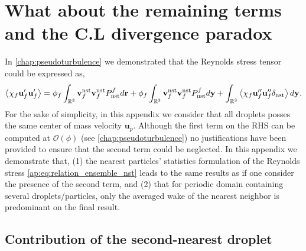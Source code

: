 \section{What about the remaining terms and the C.L divergence paradox }

In \ref{chap:pseudoturbulence} we demonstrated that the Reynolds stress tensor could be expressed as,
\begin{equation}
    \avg{\chi_f \textbf{u}_f'\textbf{u}_f'}
    = 
    \phi_f
    \int_{\mathbb{R}^3}
    \textbf{v}_f^\text{nst}
    \textbf{v}_f^\text{nst}
    P_\text{nst}^f
    d\textbf{r}
    + 
    \phi_f
    \int_{\mathbb{R}^3}
    \textbf{v}_f^\text{nst}
    \textbf{v}_f^\text{nst}
    P_\text{nst}^f
    d\textbf{y}
    + 
    \int_{\mathbb{R}^3}
    \avg{
        \chi_f
        \textbf{u}_f''
        \textbf{u}_f''
        \delta_\text{nst}
    }
    d\textbf{y}.
    \label{ap:eq:relation_ensemble_nst}
\end{equation}
For the sake of simplicity, in this appendix we consider that all droplets posses the same center of mass velocity $\textbf{u}_p$. 
Although the first term on the RHS can be computed at $\mathcal{O}(\phi)$ (see \ref{chap:pseudoturbulence}) no justifications have been provided to ensure that the second term could be neglected. 
In this appendix we demonstrate that, (1) the nearest particles' statistics formulation of the Reynolds stress \eqref{ap:eq:relation_ensemble_nst} leads to the same results as \citet{caflisch1985variance} if one consider the presence of the second term, and (2) that for periodic domain containing several droplets/particles, only the averaged wake of the nearest neighbor is predominant on the final result. 

\subsection{Contribution of the second-nearest droplet}

